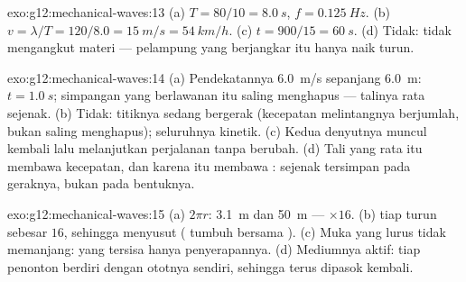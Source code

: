 \begin{solution}{exo:g12:mechanical-waves:13}
(a) $T = 80/10 = \qty{8.0}{s}$, $f = \qty{0.125}{Hz}$.
(b) $v = \lambda/T = 120/8.0 = \qty{15}{m/s} = \qty{54}{km/h}$.
(c) $t = 900/15 = \qty{60}{s}$. (d) Tidak:  tidak mengangkut
materi --- pelampung yang berjangkar itu hanya naik turun.
\end{solution}

\begin{solution}{exo:g12:mechanical-waves:14}
(a) Pendekatannya \qty{6.0}{m/s} sepanjang \qty{6.0}{m}:
$t = \qty{1.0}{s}$; simpangan yang berlawanan itu saling menghapus ---
talinya rata sejenak. (b) Tidak: titiknya sedang bergerak (kecepatan
melintangnya berjumlah, bukan saling menghapus);  seluruhnya
kinetik. (c) Kedua denyutnya muncul kembali lalu melanjutkan perjalanan
tanpa berubah. (d) Tali yang rata itu membawa kecepatan, dan karena itu
membawa :  sejenak tersimpan pada geraknya, bukan pada
bentuknya.
\end{solution}

\begin{solution}{exo:g12:mechanical-waves:15}
(a) $2\pi r$: \qty{3.1}{m} dan \qty{50}{m} --- $\times 16$.
(b)  tiap  turun sebesar $16$, sehingga 
menyusut ( tumbuh bersama ). (c) Muka yang lurus
tidak memanjang: yang tersisa hanya penyerapannya. (d) Mediumnya aktif:
tiap penonton berdiri dengan  ototnya sendiri, sehingga
 terus dipasok kembali.
\end{solution}


